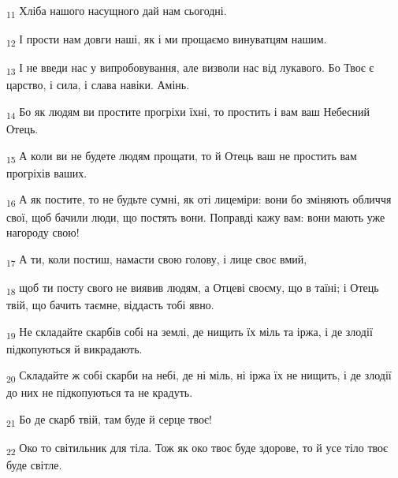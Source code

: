 \begin{tcolorbox}
\textsubscript{11} Хліба нашого насущного дай нам сьогодні.
\end{tcolorbox}
\begin{tcolorbox}
\textsubscript{12} І прости нам довги наші, як і ми прощаємо винуватцям нашим.
\end{tcolorbox}
\begin{tcolorbox}
\textsubscript{13} І не введи нас у випробовування, але визволи нас від лукавого. Бо Твоє є царство, і сила, і слава навіки. Амінь.
\end{tcolorbox}
\begin{tcolorbox}
\textsubscript{14} Бо як людям ви простите прогріхи їхні, то простить і вам ваш Небесний Отець.
\end{tcolorbox}
\begin{tcolorbox}
\textsubscript{15} А коли ви не будете людям прощати, то й Отець ваш не простить вам прогріхів ваших.
\end{tcolorbox}
\begin{tcolorbox}
\textsubscript{16} А як постите, то не будьте сумні, як оті лицеміри: вони бо зміняють обличчя свої, щоб бачили люди, що постять вони. Поправді кажу вам: вони мають уже нагороду свою!
\end{tcolorbox}
\begin{tcolorbox}
\textsubscript{17} А ти, коли постиш, намасти свою голову, і лице своє вмий,
\end{tcolorbox}
\begin{tcolorbox}
\textsubscript{18} щоб ти посту свого не виявив людям, а Отцеві своєму, що в таїні; і Отець твій, що бачить таємне, віддасть тобі явно.
\end{tcolorbox}
\begin{tcolorbox}
\textsubscript{19} Не складайте скарбів собі на землі, де нищить їх міль та іржа, і де злодії підкопуються й викрадають.
\end{tcolorbox}
\begin{tcolorbox}
\textsubscript{20} Складайте ж собі скарби на небі, де ні міль, ні іржа їх не нищить, і де злодії до них не підкопуються та не крадуть.
\end{tcolorbox}
\begin{tcolorbox}
\textsubscript{21} Бо де скарб твій, там буде й серце твоє!
\end{tcolorbox}
\begin{tcolorbox}
\textsubscript{22} Око то світильник для тіла. Тож як око твоє буде здорове, то й усе тіло твоє буде світле.
\end{tcolorbox}
